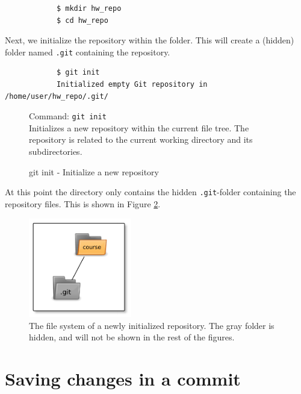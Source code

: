 \documentclass[../main/git_course_main.tex]{subfiles}
\begin{document}
	\begin{codebox}
		\begin{lstlisting}
			$ mkdir hw_repo
			$ cd hw_repo
		\end{lstlisting}
	\end{codebox}
	
	Next, we initialize the repository within the folder. This will create a (hidden) folder named \verb$.git$ containing the repository.
	
	\begin{codebox}
		\begin{lstlisting}
			$ git init
			Initialized empty Git repository in /home/user/hw_repo/.git/
		\end{lstlisting}
	\end{codebox}
	
	\begin{figure}[h!]
		\begin{bluebox}
			Command: \verb$git init$ \\
			
			Initializes a new repository within the current file tree. The repository is related to the current working directory and its subdirectories.
		\end{bluebox}
		\label{command:init}
		\caption{git init - Initialize a new repository}
	\end{figure}
	
	At this point the directory only contains the hidden \verb$.git$-folder containing the repository files. This is shown in Figure \ref{fig:dot_git}.
	
	\begin{figure}[h]
		\centering
		\includegraphics[width=0.4\textwidth]{../visualizations/chapter2/c23_hidden_folder_in_git.pdf}
		\caption{The file system of a newly initialized repository. The gray folder is hidden, and will not be shown in the rest of the figures.}
		\label{fig:dot_git}
	\end{figure}
	
	\section{Saving changes in a commit}
	
\end{document}
